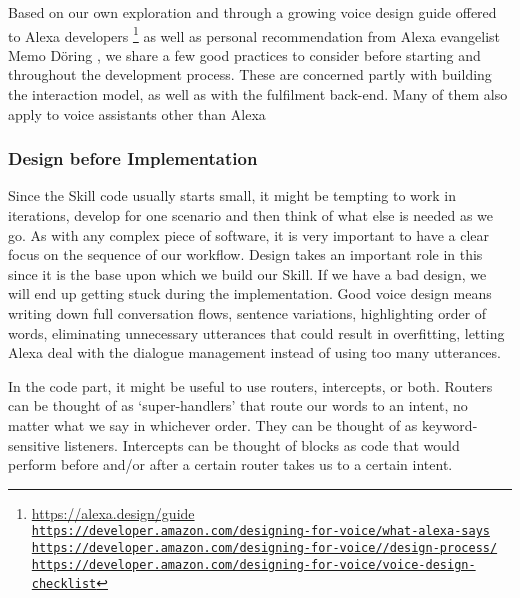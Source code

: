 Based on our own exploration and through a growing voice design guide offered to Alexa developers \footnote{\url{https://alexa.design/guide} \\ \href{https://developer.amazon.com/designing-for-voice/what-alexa-says/}{\lstinline|https://developer.amazon.com/designing-for-voice/what-alexa-says|}\\
	\href{https://developer.amazon.com/designing-for-voice/design-process/}{\lstinline|https://developer.amazon.com/designing-for-voice//design-process/|}\\
	\href{https://developer.amazon.com/designing-for-voice/voice-design-checklist}{\lstinline|https://developer.amazon.com/designing-for-voice/voice-design-checklist|}
} as well as personal recommendation from Alexa evangelist Memo Döring \cite{memo:devDay}, we share a few good practices to consider before starting and throughout the development process. These are concerned partly with building the interaction model, as well as with the fulfilment back-end. Many of them also apply to voice assistants other than Alexa






\subsubsection*{Design before Implementation}
Since the Skill code usually starts small, it might be tempting to work in iterations, develop for one scenario and then think of what else is needed as we go.
As with any complex piece of software, it is very important to have a clear focus on the sequence of our workflow. Design takes an important role in this since it is the base upon which we build our Skill. If we have a bad design, we will end up getting stuck during the implementation. Good voice design means writing down full conversation flows, sentence variations, highlighting order of words, eliminating unnecessary utterances that could result in overfitting, letting Alexa deal with the dialogue management instead of using too many utterances.

In the code part, it might be useful to use routers, intercepts, or both.
Routers can be thought of as `super-handlers' that route our words to an intent, no matter what we say in whichever order. They can be thought of as keyword-sensitive listeners. Intercepts can be thought of blocks as code that would perform before and/or after a certain router takes us to a certain intent.

